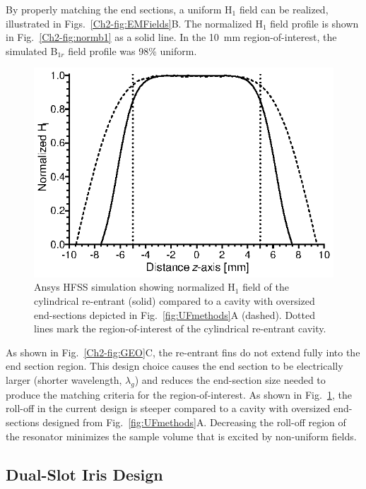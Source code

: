 By properly matching the end sections, a uniform H$_1$ field can be realized, illustrated in Figs.~\ref{Ch2-fig:EMFields}B. The normalized H$_1$ field profile is shown in Fig.~\ref{Ch2-fig:normb1} as a solid line. In the 10~mm region-of-interest, the simulated B$_{1r}$ field profile was 98\% uniform. 

\begin{figure}[htb]\centering
 \includegraphics{Kapitel/Ch2-Images/ComparisonOfEndSections.eps}
 \caption[Ansys HFSS simulation comparing oversized and re-entrant end sections.]{Ansys HFSS simulation showing normalized H$_1$ field of the cylindrical re-entrant \cylTE{} (solid) compared to a \cylTE{} cavity with oversized end-sections depicted in Fig.~\ref{fig:UFmethods}A (dashed). Dotted lines mark the region-of-interest of the cylindrical re-entrant \cylTE{} cavity. }
 \label{Ch2-fig:normb1compare}
\end{figure}

As shown in Fig.~\ref{Ch2-fig:GEO}C, the re-entrant fins do not extend fully into the end section region. This design choice causes the end section to be electrically larger (shorter wavelength, $\lambda_g$) and reduces the end-section size needed to produce the matching criteria for the region-of-interest. As shown in Fig.~\ref{Ch2-fig:normb1compare}, the roll-off in the current design is steeper compared to a \cylTE{} cavity with oversized end-sections designed from Fig.~\ref{fig:UFmethods}A. Decreasing the roll-off region of the resonator minimizes the sample volume that is excited by non-uniform fields.

\subsection{Dual-Slot Iris Design}

